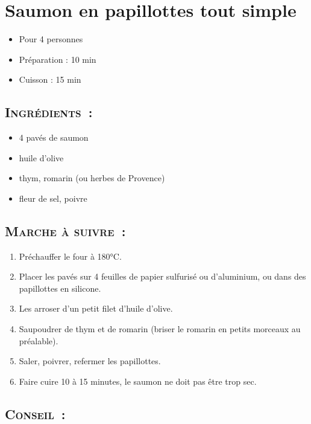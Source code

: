 \section{Saumon en papillottes tout simple}

\begin{itemize}
\item Pour 4 personnes		%
\item Préparation : 10 min		%
\item Cuisson : 15 min			%
\end{itemize}

\subsection*{\textsc{Ingrédients~:}}

\begin{itemize}
\item 4 pavés de saumon
\item huile d'olive
\item thym, romarin (ou herbes de Provence)
\item fleur de sel, poivre
\end{itemize}


\subsection*{\textsc{Marche à suivre~:}}

\begin{enumerate}
\item Préchauffer le four à 180°C.

\item Placer les pavés sur 4 feuilles de papier sulfurisé ou d'aluminium, ou dans des papillottes en silicone.

\item Les arroser d'un petit filet d'huile d'olive.

\item Saupoudrer de thym et de romarin (briser le romarin en petits morceaux au préalable).

\item Saler, poivrer, refermer les papillottes.

\item Faire cuire 10 à 15 minutes, le saumon ne doit pas être trop sec.

\end{enumerate}


\subsection*{\textsc{Conseil~:}}


